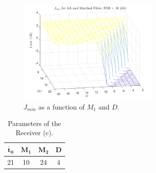\documentclass[a4paper, 12pt]{report}
\begin{document}
\begin{figure}[H]
	\centering
	\includegraphics[width=7cm]{images/optimal_params_AntiAliasing}
	\caption{$J_{min}$ as a function of $M_1$ and $D$.}\label{j_min_aa}
\end{figure}

\begin{table}[H]
	\centering
	\begin{tabular}{c c c c}
		\toprule
		$\mathbf{\bar{t}_0}$ & $\mathbf{M_1}$ & $\mathbf{M_2}$ & \textbf{D}     \\
		\midrule
		21 & 10 & 24 & 4 \\
		\bottomrule			
	\end{tabular}
	\caption{Parameters of the Receiver (c).}
	\label{Tab_c}
\end{table}
\end{document}
